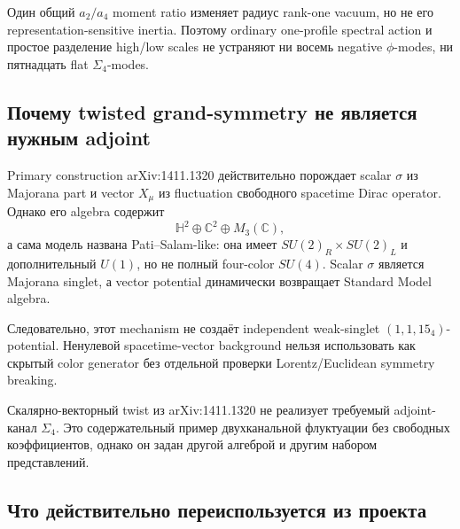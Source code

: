 \begin{theorem}
Один общий \(a_2/a_4\) moment ratio изменяет радиус rank-one vacuum, но не
его representation-sensitive inertia. Поэтому ordinary one-profile
spectral action и простое разделение high/low scales не устраняют ни восемь
negative \(\phi\)-modes, ни пятнадцать flat \(\Sigma_4\)-modes.
\end{theorem}

\subsection{Почему twisted grand-symmetry не является нужным adjoint}

Primary construction arXiv:1411.1320 действительно порождает scalar
\(\sigma\) из Majorana part и vector \(X_\mu\) из fluctuation свободного
spacetime Dirac operator. Однако его algebra содержит
\begin{equation}
 \mathbb H^2\oplus\mathbb C^2\oplus M_3(\mathbb C),
\end{equation}
а сама модель названа Pati--Salam-like: она имеет
\(SU(2)_R\times SU(2)_L\) и дополнительный \(U(1)\), но не полный
four-color \(SU(4)\). Scalar \(\sigma\) является Majorana singlet, а
vector potential динамически возвращает Standard Model algebra.

Следовательно, этот mechanism не создаёт independent weak-singlet
\((1,1,15_4)\)-potential. Ненулевой spacetime-vector background нельзя
использовать как скрытый color generator без отдельной проверки
Lorentz/Euclidean symmetry breaking.

\begin{nogocriterion}
Скалярно-векторный twist из arXiv:1411.1320 не реализует требуемый
adjoint-канал \(\Sigma_4\). Это содержательный пример двухканальной
флуктуации без свободных коэффициентов, однако он задан другой алгеброй и
другим набором представлений.
\end{nogocriterion}

\subsection{Что действительно переиспользуется из проекта}


